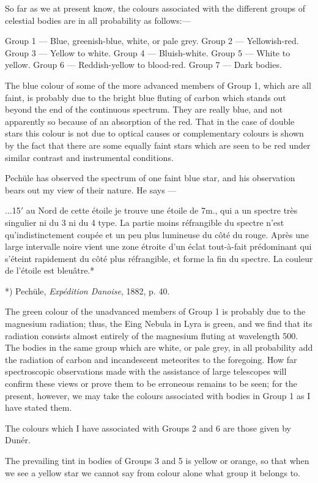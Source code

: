 \documentclass[a4paper, 12pt, oneside, polutonikogreek, english]{article}
\begin{document}
So far as we at present know, the colours associated with the different groups of celestial bodies are in all probability as follows:---

Group 1 --- Blue, greenish-blue, white, or pale grey. 
Group 2 --- Yellowish-red. 
Group 3 --- Yellow to white. 
Group 4 --- Bluish-white. 
Group 5 --- White to yellow. 
Group 6 --- Reddish-yellow to blood-red. 
Group 7 --- Dark bodies.

The blue colour of some of the more advanced members of Group 1, which are all faint, is probably due to the bright blue fluting of carbon which stands out beyond the end of the continuous spectrum. They are really blue, and not apparently so because of an absorption of the red. That in the case of double stars this colour is not due to optical causes or complementary colours is shown by the fact that there are some equally faint stars which are seen to be red under similar contrast and instrumental conditions.

Pechüle has observed the spectrum of one faint blue star, and his observation bears out my view of their nature. He says ---

...15$\prime$ au Nord de cette étoile je trouve une étoile de 7m., qui a un spectre très singulier ni du 3 ni du 4 type. La partie moins réfrangible du spectre n'est qu'indistinctement coupée et un peu plus lumineuse du côté du rouge. Après une large intervalle noire vient une zone étroite d'un éclat tout-à-fait prédominant qui s'éteint rapidement du côté plus réfrangible, et forme la fin du spectre. La couleur de l'étoile est bleuâtre.*

*) Pechüle, \emph{Expédition Danoise}, 1882, p. 40.

The green colour of the unadvanced members of Group 1 is probably due to the magnesium radiation; thus, the Eing Nebula in Lyra is green, and we find that its radiation consists almost entirely of the magnesium fluting at wavelength 500. The bodies in the same group which are white, or pale grey, in all probability add the radiation of carbon and incandescent meteorites to the foregoing. How far spectroscopic observations made with the assistance of large telescopes will confirm these views or prove them to be erroneous remains to be seen; for the present, however, we may take the colours associated with bodies in Group 1 as I have stated them.

The colours which I have associated with Groups 2 and 6 are those given by Dunér.

The prevailing tint in bodies of Groups 3 and 5 is yellow or orange, so that when we see a yellow star we cannot say from colour alone what group it belongs to.
\end{document}
